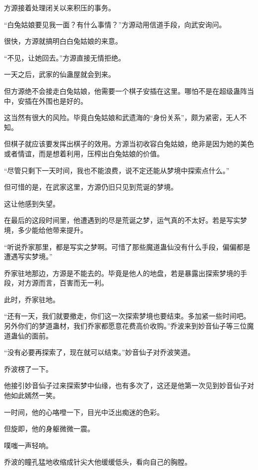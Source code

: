 
\begin{this_body}



方源接着处理闭关以来积压的事务。

“白兔姑娘要见我一面？有什么事情？”方源动用信道手段，向武安询问。

很快，方源就搞明白白兔姑娘的来意。

“不见，让她回去。”方源直接无情拒绝。

一天之后，武家的仙蛊屋就会到来。

但方源绝不会接走白兔姑娘，他需要一个棋子安插在这里。哪怕不是在超级蛊阵当中，安插在外围也是好的。

这当然有很大的风险。毕竟白兔姑娘和武遗海的“身份关系”，颇为紧密，无人不知。

但棋子就应该要发挥出棋子的效用。方源当初收容白兔姑娘，绝非是因为她的美色或者情谊，而是想着利用，压榨出白兔姑娘的价值。

“尽管只剩下一天时间，我也不能浪费，说不定还能从梦境中探索点什么。”

但可惜的是，在武家这里，方源仍旧只见到荒诞的梦境。

这让他感到失望。

在最后的这段时间里，他遭遇到的尽是荒诞之梦，运气真的不太好。若是写实梦境，多少能给他带来提升。

“听说乔家那里，都是写实之梦啊。可惜了那些魔道蛊仙没有什么手段，偏偏都是遭遇写实梦境。”

乔家驻地那边，方源是不能去的。毕竟是他人的地盘，若是暴露出探索梦境的手段，对方源而言，百害而无一利。

此时，乔家驻地。

“还有一天，我们就要撤走，你们这一次探索梦境也要结束。多加紧一些时间吧。另外你们的梦道蛊材，我们乔家都愿意花费高价收购。”乔波来到妙音仙子等三位魔道蛊仙的面前。

“没有必要再探索了，现在就可以结束。”妙音仙子对乔波笑道。

乔波楞了一下。

他接引妙音仙子过来探索梦中仙缘，也有多次了，这还是他第一次见到妙音仙子对他如此嫣然一笑。

一时间，他的心咯噔一下，目光中泛出痴迷的色彩。

但旋即，他的身躯微微一震。

噗嗤一声轻响。

乔波的瞳孔猛地收缩成针尖大他缓缓低头，看向自己的胸膛。


\end{this_body}
